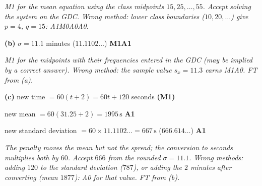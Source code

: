 \documentclass[12pt, twoside]{article}
\begin{document}
\begin{enumerate}[itemsep=0.3cm]
\emph{M1 for the mean equation using the class midpoints $15, 25, \ldots,
55$. Accept solving the system on the GDC. Wrong method: lower class
boundaries ($10, 20, \ldots$) give $p = 4$, $q = 15$: A1M0A0A0.}

\textbf{(b)} $\sigma = 11.1$ minutes \quad ($11.1102\ldots$) \hfill \textbf{M1A1}

\emph{M1 for the midpoints with their frequencies entered in the GDC (may
be implied by a correct answer). Wrong method: the sample value
$s_{x} = 11.3$ earns M1A0. FT from (a).}

\textbf{(c)} new time $= 60(t + 2) = 60t + 120$ seconds \hfill \textbf{(M1)}

new mean $= 60(31.25 + 2) = 1995\,\text{s}$ \hfill \textbf{A1}

new standard deviation $= 60 \times 11.1102\ldots = 667\,\text{s}$ \quad ($666.614\ldots$) \hfill \textbf{A1}

\emph{The penalty moves the mean but not the spread; the conversion to
seconds multiplies both by $60$. Accept $666$ from the rounded $\sigma =
11.1$. Wrong methods: adding $120$ to the standard deviation ($787$), or
adding the $2$ minutes after converting (mean $1877$): A0 for that value.
FT from (b).}

\end{enumerate}
\end{document}
